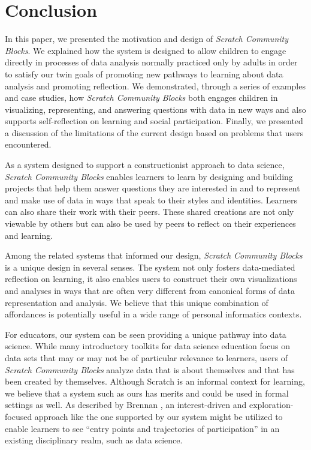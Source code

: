 \documentclass{sigchi}
\begin{document}
\section{Conclusion}

In this paper, we presented the motivation and design of \emph{Scratch Community Blocks}. We explained how the system is designed to allow children to engage directly in processes of data analysis normally practiced only by adults in order to satisfy our twin goals of promoting new pathways to learning about data analysis and promoting reflection. We demonstrated, through a series of examples and case studies, how \emph{Scratch Community Blocks} both engages children in visualizing, representing, and answering questions with data in new ways and also supports self-reflection on learning and social participation. Finally, we presented a discussion of the limitations of the current design based on problems that users encountered.

As a system designed to support a constructionist approach to data science, \emph{Scratch Community Blocks} enables learners to learn by designing and building projects that help them answer questions they are interested in and to represent and make use of data in ways that speak to their styles and identities. Learners can also share their work with their peers. These shared creations are not only viewable by others but can also be used by peers to reflect on their experiences and learning. %

Among the related systems that informed our design, \emph{Scratch Community Blocks} is a unique design in several senses. The system not only fosters data-mediated reflection on learning, it also enables users to construct their own visualizations and analyses in ways that are often very different from canonical forms of data representation and analysis. We believe that this unique combination of affordances is potentially useful in a wide range of personal informatics contexts.

For educators, our system can be seen providing a unique pathway into data science. While many introductory toolkits for data science education focus on data sets that may or may not be of particular relevance to learners, users of \emph{Scratch Community Blocks} analyze data that is about themselves and that has been created by themselves.
Although Scratch is an informal context for learning, we believe that a system such as ours has merits and could be used in formal settings as well. As described by Brennan \cite{brennan_best_2013}, an interest-driven and exploration-focused approach like the one supported by our system might be utilized to enable learners to see ``entry points and trajectories of participation'' in an existing disciplinary realm, such as data science.
\end{document}
